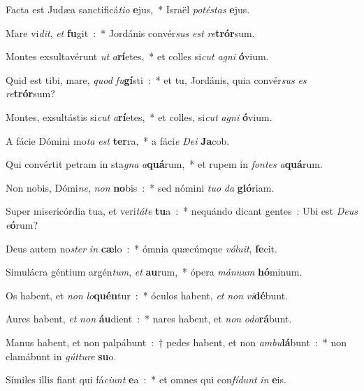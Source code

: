 ﻿\item Facta est Judæa san\-cti\-fi\-cá\-\emph{ti}\-\emph{o} \textbf{e}jus,~* Israël \emph{po}\-\emph{té}\-\emph{stas} \textbf{e}jus.
\item Mare vi\emph{dit}, \emph{et} \textbf{fu}\-git~:~* Jordánis convér\emph{sus} \emph{est} \emph{re}\textbf{trór}sum.
\item Montes exsultavérunt \emph{ut} \emph{a}\-\textbf{rí}\-etes,~* et colles si\emph{cut} \emph{a}\-\emph{gni} \textbf{ó}vium.
\item Quid est tibi, mare, \emph{quod} \emph{fu}\-\textbf{gí}\-sti~:~* et tu, Jordánis, quia convér\emph{sus} \emph{es} \emph{re}\textbf{trór}sum?
\item Montes, exsultástis si\emph{cut} \emph{a}\-\textbf{rí}\-etes,~* et colles, si\emph{cut} \emph{a}\-\emph{gni} \textbf{ó}vium.
\item A fácie Dómini mo\emph{ta} \emph{est} \textbf{ter}\-ra,~* a fáci\emph{e} \emph{De}\-\emph{i} \textbf{Ja}cob.
\item Qui convértit petram in sta\emph{gna} \emph{a}\-\textbf{quá}\-rum,~* et rupem in \emph{fon}\-\emph{tes} \emph{a}\textbf{quá}rum.
\item Non nobis, Dómi\emph{ne}, \emph{non} \textbf{no}\-bis~:~* sed nómini \emph{tu}\-\emph{o} \emph{da} \textbf{gló}riam.
\item Super misericórdia tua, et veri\emph{tá}\-\emph{te} \textbf{tu}a~:~* nequándo dicant gentes~: Ubi est \emph{De}\-\emph{us} \emph{e}\textbf{ó}rum?
\item Deus autem no\emph{ster} \emph{in} \textbf{cæ}\-lo~:~* ómnia quæcúmque \emph{vó}\-\emph{lu}\-\emph{it}, \textbf{fe}cit.
\item Simulácra géntium argén\emph{tum}, \emph{et} \textbf{au}\-rum,~* ópera \emph{má}\-\emph{nu}\-\emph{um} \textbf{hó}minum.
\item Os habent, et \emph{non} \emph{lo}\-\textbf{quén}\-tur~:~* óculos habent, \emph{et} \emph{non} \emph{vi}\textbf{dé}bunt.
\item Aures habent, \emph{et} \emph{non} \textbf{áu}\-dient~:~* nares habent, et \emph{non} \emph{o}\-\emph{do}\-\textbf{rá}\-bunt.
\item Manus habent, et non palpábunt~:~† pedes habent, et non \emph{am}\-\emph{bu}\-\textbf{lá}\-bunt~:~* non clamábunt in \emph{gút}\-\emph{tu}\-\emph{re} \textbf{su}o.
\item Símiles illis fiant qui fá\emph{ci}\-\emph{unt} \textbf{e}a~:~* et omnes qui con\-\emph{fí}\-\emph{dunt} \emph{in} \textbf{e}is.
